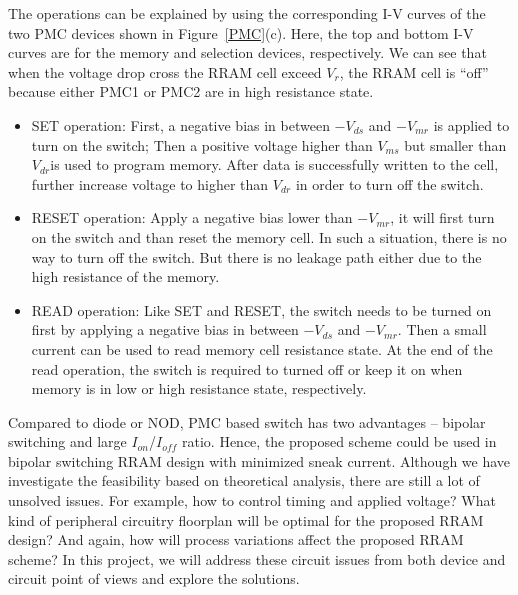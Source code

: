 The operations can be explained by using the corresponding I-V curves of the two PMC devices shown in Figure~\ref{PMC}(c). Here, the top and bottom I-V curves are for the memory and selection devices, respectively. We can see that when the voltage drop cross the RRAM cell exceed $V_{r}$, the RRAM cell is ``off'' because either PMC1 or PMC2 are in high resistance state.
\begin{itemize}
  \item SET operation: First, a negative bias in between $-V_{ds}$ and $-V_{mr}$ is applied to turn on the switch; Then a positive voltage higher than $V_{ms}$ but smaller than $V_{dr}$is used to program memory. After data is successfully written to the cell, further increase voltage to higher than $V_{dr}$ in order to turn off the switch.
  \item RESET operation: Apply a negative bias lower than $-V_{mr}$, it will first turn on the switch and than reset the memory cell. In such a situation, there is no way to turn off the switch.  But there is no leakage path either due to the high resistance of the memory.
  \item READ operation: Like SET and RESET, the switch needs to be turned on first by applying a negative bias in between $-V_{ds}$ and $-V_{mr}$. Then a small current can be used to read memory cell resistance state.  At the end of the read operation, the switch is required to turned off or keep it on when memory is in low or high resistance state, respectively.
\end{itemize}

Compared to diode or NOD, PMC based switch has two advantages -- bipolar switching and large $I_{on}$/$I_{off}$ ratio. Hence, the proposed scheme could be used in bipolar switching RRAM design with minimized sneak current. Although we have investigate the feasibility based on theoretical analysis, there are still a lot of unsolved issues. For example, how to control timing and applied voltage? What kind of peripheral circuitry floorplan will be optimal for the proposed RRAM design? And again, how will process variations affect the proposed RRAM scheme? In this project, we will address these circuit issues from both device and circuit point of views and explore the solutions.
